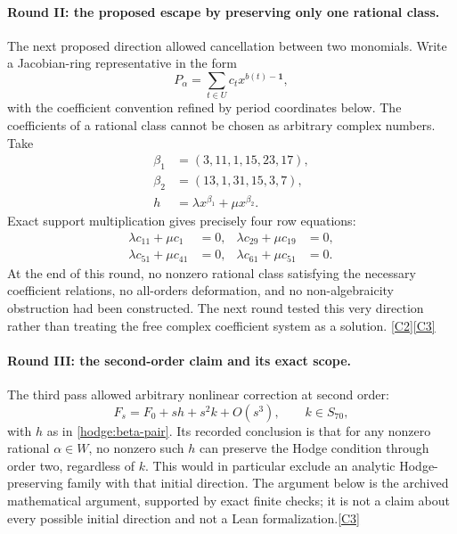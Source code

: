 \documentclass[11pt]{article}
\newcommand{\src}[1]{\hyperlink{src:#1}{[#1]}}
\begin{document}
\paragraph{Round II: the proposed escape by preserving only one rational class.}
The next proposed direction allowed cancellation between two monomials.
Write a Jacobian-ring representative in the form
\[
 P_\alpha=\sum_{t\in U}c_t x^{b(t)-\mathbf1},
\]
with the coefficient convention refined by period coordinates below. The
coefficients of a rational class cannot be chosen as arbitrary complex
numbers. Take
\begin{equation}\label{hodge:beta-pair}
 \begin{aligned}
 \beta_1&=(3,11,1,15,23,17),\\
 \beta_2&=(13,1,31,15,3,7),\\
 h&=\lambda x^{\beta_1}+\mu x^{\beta_2}.
 \end{aligned}
\end{equation}
Exact support multiplication gives precisely four row equations:
\begin{equation}\label{hodge:four-rows}
 \begin{aligned}
 \lambda c_{11}+\mu c_1&=0,&
 \lambda c_{29}+\mu c_{19}&=0,\\
 \lambda c_{51}+\mu c_{41}&=0,&
 \lambda c_{61}+\mu c_{51}&=0.
 \end{aligned}
\end{equation}
At the end of this round, no nonzero rational class satisfying the necessary
coefficient relations, no all-orders deformation, and no non-algebraicity
obstruction had been constructed. The next round tested this very direction
rather than treating the free complex coefficient system as a solution.
\src{C2}\src{C3}

\paragraph{Round III: the second-order claim and its exact scope.}
The third pass allowed arbitrary nonlinear correction at second order:
\begin{equation}\label{hodge:second-order-family}
 F_s=F_0+s h+s^2k+O(s^3),\qquad k\in S_{70},
\end{equation}
with $h$ as in \eqref{hodge:beta-pair}. Its recorded conclusion is that for
any nonzero rational $\alpha\in W$, no nonzero such $h$ can preserve the
Hodge condition through order two, regardless of $k$. This would in
particular exclude an analytic Hodge-preserving family with that initial
direction. The argument below is the archived mathematical argument,
supported by exact finite checks; it is not a claim about every possible
initial direction and not a Lean formalization.\src{C3}
\end{document}
